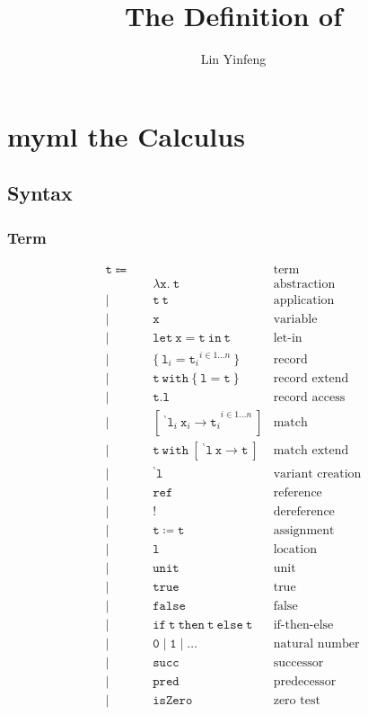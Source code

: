 \documentclass{report}
\title{The Definition of \theLang}
\author{Lin Yinfeng}
\newcommand{\theLang}{myml}
\newcommand{\code}{\mathtt}
\newcommand{\backtick}{{}^{\backprime}}
\begin{document}
\maketitle

\tableofcontents

\chapter{\theLang{} the Calculus}

\section{Syntax}

\subsection{Term}

\begin{align*}
\code{t} \Coloneqq \quad & & \text{term} \\
& \code{\lambda x.\ t} & \text{abstraction} \\
| \quad & \code{t\ t} & \text{application} \\
| \quad & \code{x} & \text{variable} \\
| \quad & \code{let\ x = t\ in\ t} & \text{let-in} \\
| \quad & \{\ {\code{l}_i = \code{t}_i}^{i \in 1\dots n}\ \} & \text{record} \\
| \quad & \code{t\ with\ \{\ l = t\ \}} & \text{record extend} \\
| \quad & \code{t.l} & \text{record access} \\
| \quad & [ {\code{\ \backtick l}_i\ \code{x}_i \rightarrow \code{t}_i}^{i \in 1\dots n} \ ] & \text{match} \\
| \quad & \code{t\ with\ [\ \backtick l\ x \rightarrow t\ ]} & \text{match extend} \\
| \quad & \code{\backtick l} & \text{variant creation} \\
| \quad & \code{ref} & \text{reference} \\
| \quad & \code{!} & \text{dereference} \\
| \quad & \code{t \coloneqq t} & \text{assignment} \\
| \quad & \code{l} & \text{location} \\
| \quad & \code{unit} & \text{unit} \\
| \quad & \code{true} & \text{true} \\
| \quad & \code{false} & \text{false} \\
| \quad & \code{if\ t\ then\ t\ else\ t} & \text{if-then-else} \\
| \quad & \code{0} \mid \code{1} \mid \dots & \text{natural number} \\
| \quad & \code{succ} & \text{successor} \\
| \quad & \code{pred} & \text{predecessor} \\
| \quad & \code{isZero} & \text{zero test} \\
\end{align*}
\end{document}
